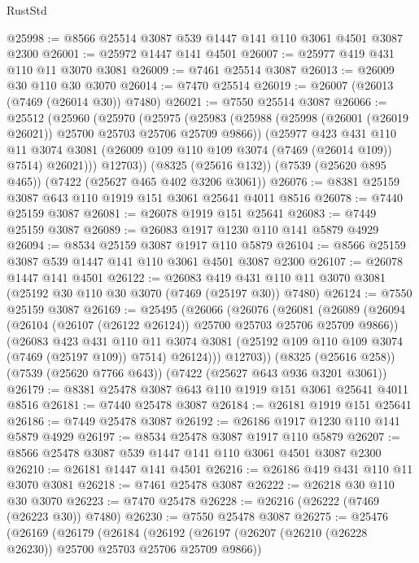 \begin{lexlean}{RustStd}
\begin{coremodule}
@25998 := @8566 @25514 @3087 @539 @1447 @141 @110 @3061 @4501 @3087 @2300
@26001 := @25972 @1447 @141 @4501
@26007 := @25977 @419 @431 @110 @11 @3070 @3081
@26009 := @7461 @25514 @3087
@26013 := @26009 @30 @110 @30 @3070
@26014 := @7470 @25514
@26019 := @26007 (@26013 (@7469 (@26014 @30)) @7480)
@26021 := @7550 @25514 @3087
@26066 := @25512
    (@25960
      (@25970
        (@25975
          (@25983
            (@25988 (@25998 (@26001 (@26019 @26021)) @25700 @25703 @25706 @25709 @9866))
            (@25977
              @423
              @431
              @110
              @11
              @3074
              @3081
              (@26009 @109 @110 @109 @3074 (@7469 (@26014 @109)) @7514)
              @26021)))
        @12703))
    (@8325 (@25616 @132))
    (@7539 (@25620 @895 @465))
    (@7422 (@25627 @465 @402 @3206 @3061))
@26076 := @8381 @25159 @3087 @643 @110 @1919 @151 @3061 @25641 @4011 @8516
@26078 := @7440 @25159 @3087
@26081 := @26078 @1919 @151 @25641
@26083 := @7449 @25159 @3087
@26089 := @26083 @1917 @1230 @110 @141 @5879 @4929
@26094 := @8534 @25159 @3087 @1917 @110 @5879
@26104 := @8566 @25159 @3087 @539 @1447 @141 @110 @3061 @4501 @3087 @2300
@26107 := @26078 @1447 @141 @4501
@26122 := @26083
    @419
    @431
    @110
    @11
    @3070
    @3081
    (@25192 @30 @110 @30 @3070 (@7469 (@25197 @30)) @7480)
@26124 := @7550 @25159 @3087
@26169 := @25495
    (@26066
      (@26076
        (@26081
          (@26089
            (@26094 (@26104 (@26107 (@26122 @26124)) @25700 @25703 @25706 @25709 @9866))
            (@26083
              @423
              @431
              @110
              @11
              @3074
              @3081
              (@25192 @109 @110 @109 @3074 (@7469 (@25197 @109)) @7514)
              @26124)))
        @12703))
    (@8325 (@25616 @258))
    (@7539 (@25620 @7766 @643))
    (@7422 (@25627 @643 @936 @3201 @3061))
@26179 := @8381 @25478 @3087 @643 @110 @1919 @151 @3061 @25641 @4011 @8516
@26181 := @7440 @25478 @3087
@26184 := @26181 @1919 @151 @25641
@26186 := @7449 @25478 @3087
@26192 := @26186 @1917 @1230 @110 @141 @5879 @4929
@26197 := @8534 @25478 @3087 @1917 @110 @5879
@26207 := @8566 @25478 @3087 @539 @1447 @141 @110 @3061 @4501 @3087 @2300
@26210 := @26181 @1447 @141 @4501
@26216 := @26186 @419 @431 @110 @11 @3070 @3081
@26218 := @7461 @25478 @3087
@26222 := @26218 @30 @110 @30 @3070
@26223 := @7470 @25478
@26228 := @26216 (@26222 (@7469 (@26223 @30)) @7480)
@26230 := @7550 @25478 @3087
@26275 := @25476
    (@26169
      (@26179
        (@26184
          (@26192
            (@26197 (@26207 (@26210 (@26228 @26230)) @25700 @25703 @25706 @25709 @9866))

\end{coremodule}
\end{lexlean}
